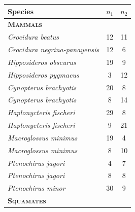 {\begin{frame}
\begin{columns}[c]
        \begin{table}%
            \scriptsize
            \addtolength{\tabcolsep}{-0.09cm}
            \def\firstrowcolor{}
            \only<2>{\def\firstrowcolor{\rowcolor{rowred}}}
            \centering
            \begin{tabular}{ l c c }
                \textbf{Species} & {\boldmath $n_1$} & {\boldmath $n_2$} \\
                \hline
                \textbf{\textsc{Mammals}} & & \\
                  \emph{Crocidura beatus}             & 12 & 11 \\
                \firstrowcolor  \emph{Crocidura negrina-panayensis} & 12 & 6  \\
                  \emph{Hipposideros obscurus}        & 19 & 9  \\
                  \emph{Hipposideros pygmaeus}        & 3  & 12 \\
                  \emph{Cynopterus brachyotis}        & 20 & 8  \\
                \firstrowcolor  \emph{Cynopterus brachyotis}        & 8  & 14 \\
                  \emph{Haplonycteris fischeri}       & 29 & 8  \\
                \firstrowcolor  \emph{Haplonycteris fischeri}       & 9  & 21 \\
                  \emph{Macroglossus minimus}         & 19 & 4  \\
                \firstrowcolor  \emph{Macroglossus minimus}         & 8  & 10 \\
                  \emph{Ptenochirus jagori}           & 4  & 7  \\
                \firstrowcolor  \emph{Ptenochirus jagori}           & 8  & 8  \\
                  \emph{Ptenochirus minor}            & 30 & 9  \\
                \textbf{\textsc{Squamates}} & & \\

\end{tabular}
\end{table}
\end{columns}
\end{frame}}
